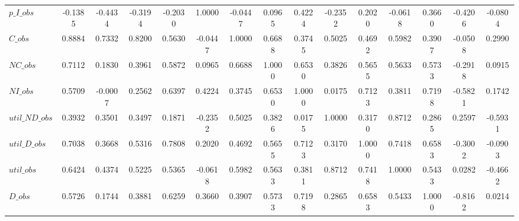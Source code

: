 \begin{center}
\begin{longtable}{lcccccccccccccc}
$p\_I\_obs      $	 & 	          -0.1385	 & 	          -0.4434	 & 	          -0.3194	 & 	          -0.2030	 & 	           1.0000	 & 	          -0.0447	 & 	           0.0965	 & 	           0.4224	 & 	          -0.2352	 & 	           0.2020	 & 	          -0.0618	 & 	           0.3660	 & 	          -0.4206	 & 	          -0.0804 \\ 
$C\_obs         $	 & 	           0.8884	 & 	           0.7332	 & 	           0.8200	 & 	           0.5630	 & 	          -0.0447	 & 	           1.0000	 & 	           0.6688	 & 	           0.3745	 & 	           0.5025	 & 	           0.4692	 & 	           0.5982	 & 	           0.3907	 & 	          -0.0508	 & 	           0.2990 \\ 
$NC\_obs        $	 & 	           0.7112	 & 	           0.1830	 & 	           0.3961	 & 	           0.5872	 & 	           0.0965	 & 	           0.6688	 & 	           1.0000	 & 	           0.6530	 & 	           0.3826	 & 	           0.5655	 & 	           0.5633	 & 	           0.5733	 & 	          -0.2918	 & 	           0.0915 \\ 
$NI\_obs        $	 & 	           0.5709	 & 	          -0.0007	 & 	           0.2562	 & 	           0.6397	 & 	           0.4224	 & 	           0.3745	 & 	           0.6530	 & 	           1.0000	 & 	           0.0175	 & 	           0.7123	 & 	           0.3811	 & 	           0.7198	 & 	          -0.5821	 & 	           0.1742 \\ 
$util\_ND\_obs  $	 & 	           0.3932	 & 	           0.3501	 & 	           0.3497	 & 	           0.1871	 & 	          -0.2352	 & 	           0.5025	 & 	           0.3826	 & 	           0.0175	 & 	           1.0000	 & 	           0.3170	 & 	           0.8712	 & 	           0.2865	 & 	           0.2597	 & 	          -0.5931 \\ 
$util\_D\_obs   $	 & 	           0.7038	 & 	           0.3668	 & 	           0.5316	 & 	           0.7808	 & 	           0.2020	 & 	           0.4692	 & 	           0.5655	 & 	           0.7123	 & 	           0.3170	 & 	           1.0000	 & 	           0.7418	 & 	           0.6583	 & 	          -0.3002	 & 	          -0.0903 \\ 
$util\_obs      $	 & 	           0.6424	 & 	           0.4374	 & 	           0.5225	 & 	           0.5365	 & 	          -0.0618	 & 	           0.5982	 & 	           0.5633	 & 	           0.3811	 & 	           0.8712	 & 	           0.7418	 & 	           1.0000	 & 	           0.5433	 & 	           0.0282	 & 	          -0.4662 \\ 
$D\_obs         $	 & 	           0.5726	 & 	           0.1744	 & 	           0.3881	 & 	           0.6259	 & 	           0.3660	 & 	           0.3907	 & 	           0.5733	 & 	           0.7198	 & 	           0.2865	 & 	           0.6583	 & 	           0.5433	 & 	           1.0000	 & 	          -0.8162	 & 	           0.0214 \\ 

\end{longtable}
\end{center}
